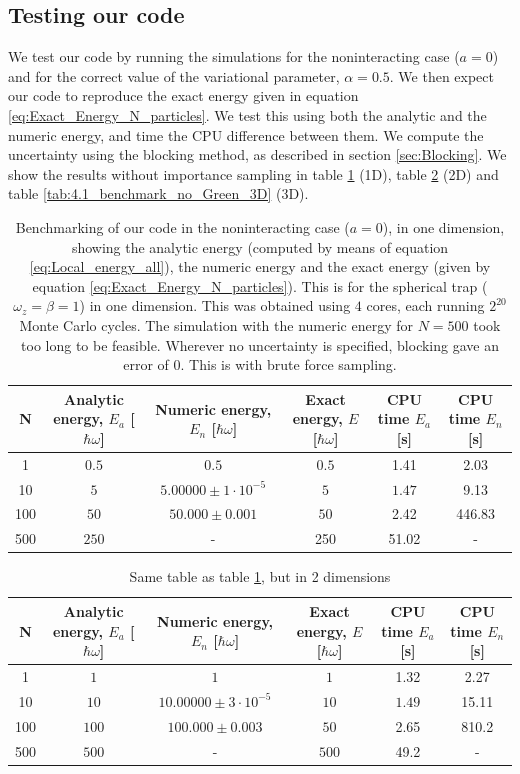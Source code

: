\documentclass[a4paper, 10pt]{article}
\begin{document}
	\subsection{Testing our code}
	We test our code by running the simulations for the noninteracting case ($a=0$) and for the correct value of the variational parameter, $\alpha=0.5$. We then expect our code to reproduce the exact energy given in equation \ref{eq:Exact_Energy_N_particles}. We test this using both the analytic and the numeric energy, and time the CPU difference between them.  We compute the uncertainty using the blocking method, as described in section \ref{sec:Blocking}. We show the results without importance sampling in table \ref{tab:4.1_benchmark_no_Green} (1D), table \ref{tab:4.1_benchmark_no_Green_2D} (2D)  and table \ref{tab:4.1_benchmark_no_Green_3D} (3D).
	\begin{table}[ht!]
		\begin{adjustwidth}{-2cm}{}
			\begin{tabular}{cccccc}
				N & Analytic energy, $E_a$ [$\hbar \omega$] & Numeric energy, $E_n$ [$\hbar \omega$] & Exact energy, $E$ [$\hbar \omega$]& CPU time $E_a$ [s] &CPU time $E_n$ [s]\\
				\hline
				1&$0.5$&$0.5$&$0.5$& 1.41&2.03\\
				10&$5$&$5.00000\pm 1\cdot 10^{-5}$&$5$& $1.47$&9.13\\
				100&$50$&$50.000\pm 0.001$&$50$&2.42&446.83\\
				500&$250$&-&250 &51.02 &-
			\end{tabular}
		\end{adjustwidth}
		\caption{Benchmarking of our code in the noninteracting case ($a=0$), in one dimension, showing the analytic energy (computed by means of equation \ref{eq:Local_energy_all}), the numeric energy and the exact energy (given by equation \ref{eq:Exact_Energy_N_particles}). This is for the spherical trap ($\omega_z=\beta=1$) in one dimension. This was obtained using $4$ cores, each running $2^{20}$ Monte Carlo cycles. The simulation with the numeric energy for $N=500$ took too long to be feasible. Wherever no uncertainty is specified, blocking gave an error of $0$. This is with brute force sampling.}\label{tab:4.1_benchmark_no_Green}
	\end{table}
	\begin{table}[ht!]
		\begin{adjustwidth}{-2cm}{}
			\begin{tabular}{cccccc}
				N & Analytic energy, $E_a$ [$\hbar \omega$] & Numeric energy, $E_n$ [$\hbar \omega$] & Exact energy, $E$ [$\hbar \omega$]& CPU time $E_a$ [s] &CPU time $E_n$ [s]\\
				\hline
				1&$1$&$1$&$1$& 1.32&2.27\\
				10&$10$&$10.00000\pm 3\cdot 10^{-5}$&$10$& $1.49$&15.11\\
				100&$100$&$100.000\pm 0.003$&$50$&2.65&810.2\\
				500&$500$&- &$500$&49.2 &-
			\end{tabular}
		\end{adjustwidth}
		\caption{Same table as table \ref{tab:4.1_benchmark_no_Green}, but in 2 dimensions}\label{tab:4.1_benchmark_no_Green_2D}
	\end{table}
\end{document}
